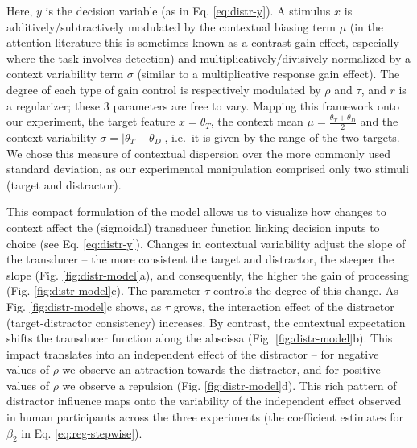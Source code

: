 \documentclass[a4paper, nobind]{templates/ociamthesis}
\begin{document}
Here, \(y\) is the decision variable (as in Eq. \eqref{eq:distr-y}). A stimulus \(x\) is additively/subtractively modulated by the contextual biasing term \(\mu\) (in the attention literature this is sometimes known as a contrast gain effect, especially where the task involves detection) and multiplicatively/divisively normalized by a context variability term \(\sigma\) (similar to a multiplicative response gain effect). The degree of each type of gain control is respectively modulated by \(\rho\) and \(\tau\), and \(r\) is a regularizer; these 3 parameters are free to vary. Mapping this framework onto our experiment, the target feature \(x=\theta_T\), the context mean \(\mu=\frac{\theta_T+\theta_D}{2}\) and the context variability \(\sigma=|\theta_T-\theta_D|\), i.e.~it is given by the range of the two targets. We chose this measure of contextual dispersion over the more commonly used standard deviation, as our experimental manipulation comprised only two stimuli (target and distractor).

This compact formulation of the model allows us to visualize how changes to context affect the (sigmoidal) transducer function linking decision inputs to choice (see Eq. \eqref{eq:distr-y}). Changes in contextual variability adjust the slope of the transducer -- the more consistent the target and distractor, the steeper the slope (Fig. \ref{fig:distr-model}a), and consequently, the higher the gain of processing (Fig. \ref{fig:distr-model}c). The parameter \(\tau\) controls the degree of this change. As Fig. \ref{fig:distr-model}c shows, as \(\tau\) grows, the interaction effect of the distractor (target-distractor consistency) increases. By contrast, the contextual expectation shifts the transducer function along the abscissa (Fig. \ref{fig:distr-model}b). This impact translates into an independent effect of the distractor -- for negative values of \(\rho\) we observe an attraction towards the distractor, and for positive values of \(\rho\) we observe a repulsion (Fig. \ref{fig:distr-model}d). This rich pattern of distractor influence maps onto the variability of the independent effect observed in human participants across the three experiments (the coefficient estimates for \(\beta_2\) in Eq. \eqref{eq:reg-stepwise}).
\end{document}
